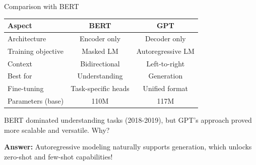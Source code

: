 \documentclass[aspectratio=169]{beamer}
\begin{document}
\begin{frame}{Comparison with BERT 🔄}
    \begin{table}
        \small
        \begin{tabular}{lcc}
            \toprule
            \textbf{Aspect} & \textbf{BERT} & \textbf{GPT} \\
            \midrule
            Architecture & Encoder only & Decoder only \\
            Training objective & Masked LM & Autoregressive LM \\
            Context & Bidirectional & Left-to-right \\
            Best for & Understanding & Generation \\
            Fine-tuning & Task-specific heads & Unified format \\
            Parameters (base) & 110M & 117M \\
            \bottomrule
        \end{tabular}
    \end{table}

    \vspace{0.3cm}

    \begin{thinkaboutit}
        BERT dominated understanding tasks (2018-2019), but GPT's approach proved more scalable and versatile. Why?
    \end{thinkaboutit}

    \vspace{0.3cm}

    \textbf{Answer:} Autoregressive modeling naturally supports generation, which unlocks zero-shot and few-shot capabilities!
\end{frame}
\end{document}
